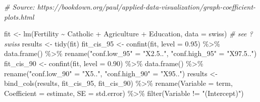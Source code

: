 \documentclass[
]{article}
\newenvironment{Shaded}{\begin{snugshade}}{\end{snugshade}}
\newcommand{\AttributeTok}[1]{\textcolor[rgb]{0.77,0.63,0.00}{#1}}
\newcommand{\CommentTok}[1]{\textcolor[rgb]{0.56,0.35,0.01}{\textit{#1}}}
\newcommand{\FloatTok}[1]{\textcolor[rgb]{0.00,0.00,0.81}{#1}}
\newcommand{\FunctionTok}[1]{\textcolor[rgb]{0.00,0.00,0.00}{#1}}
\newcommand{\NormalTok}[1]{#1}
\newcommand{\OtherTok}[1]{\textcolor[rgb]{0.56,0.35,0.01}{#1}}
\newcommand{\SpecialCharTok}[1]{\textcolor[rgb]{0.00,0.00,0.00}{#1}}
\newcommand{\StringTok}[1]{\textcolor[rgb]{0.31,0.60,0.02}{#1}}
\begin{document}
\begin{Shaded}
\begin{Highlighting}[]
\CommentTok{\# Source: https://bookdown.org/paul/applied{-}data{-}visualization/graph{-}coefficient{-}plots.html}

\NormalTok{fit }\OtherTok{\textless{}{-}} \FunctionTok{lm}\NormalTok{(Fertility }\SpecialCharTok{\textasciitilde{}}\NormalTok{ Catholic }\SpecialCharTok{+}\NormalTok{ Agriculture }\SpecialCharTok{+}\NormalTok{ Education, }\AttributeTok{data =}\NormalTok{ swiss) }\CommentTok{\# see ?swiss}
\NormalTok{results }\OtherTok{\textless{}{-}} \FunctionTok{tidy}\NormalTok{(fit)}
\NormalTok{fit\_cis\_95 }\OtherTok{\textless{}{-}} \FunctionTok{confint}\NormalTok{(fit, }\AttributeTok{level =} \FloatTok{0.95}\NormalTok{) }\SpecialCharTok{\%\textgreater{}\%} 
  \FunctionTok{data.frame}\NormalTok{() }\SpecialCharTok{\%\textgreater{}\%}
  \FunctionTok{rename}\NormalTok{(}\StringTok{"conf.low\_95"} \OtherTok{=} \StringTok{"X2.5.."}\NormalTok{,}
         \StringTok{"conf.high\_95"} \OtherTok{=} \StringTok{"X97.5.."}\NormalTok{)}
\NormalTok{fit\_cis\_90 }\OtherTok{\textless{}{-}} \FunctionTok{confint}\NormalTok{(fit, }\AttributeTok{level =} \FloatTok{0.90}\NormalTok{) }\SpecialCharTok{\%\textgreater{}\%} 
  \FunctionTok{data.frame}\NormalTok{() }\SpecialCharTok{\%\textgreater{}\%}
  \FunctionTok{rename}\NormalTok{(}\StringTok{"conf.low\_90"} \OtherTok{=} \StringTok{"X5.."}\NormalTok{,}
         \StringTok{"conf.high\_90"} \OtherTok{=} \StringTok{"X95.."}\NormalTok{)}
\NormalTok{results }\OtherTok{\textless{}{-}} \FunctionTok{bind\_cols}\NormalTok{(results, }
\NormalTok{                     fit\_cis\_95, }
\NormalTok{                     fit\_cis\_90) }\SpecialCharTok{\%\textgreater{}\%}
           \FunctionTok{rename}\NormalTok{(}\AttributeTok{Variable =}\NormalTok{ term,}
                  \AttributeTok{Coefficient =}\NormalTok{ estimate,}
                  \AttributeTok{SE =}\NormalTok{ std.error) }\SpecialCharTok{\%\textgreater{}\%}
           \FunctionTok{filter}\NormalTok{(Variable }\SpecialCharTok{!=} \StringTok{"(Intercept)"}\NormalTok{)}



\end{Highlighting}
\end{Shaded}
\end{document}
